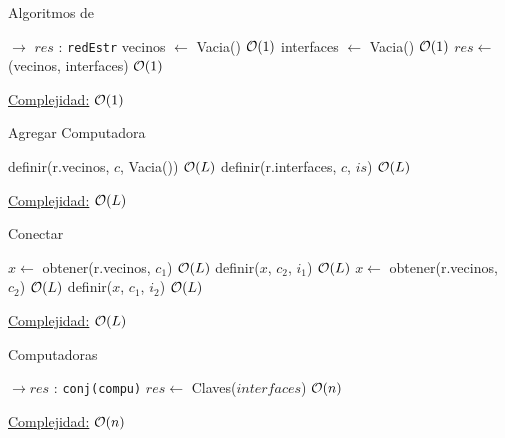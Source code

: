 \begin{Algoritmos}


\begin{algorithm}
  \caption{Algoritmos de }
\begin{algorithmic}[1]
   $\to$ $res$ : \texttt{redEstr}
  \State vecinos $\gets$ Vacia() \Comment $\mathcal{O}(1)$
  \State interfaces $\gets$ Vacia() \Comment $\mathcal{O}(1)$
  \State $res \gets$ (vecinos, interfaces) \Comment $\mathcal{O}(1)$
  \EndProcedure
\end{algorithmic}
  \underline{Complejidad:} $\mathcal{O}(1)$
\end{algorithm}


\begin{algorithm}
\caption{Agregar Computadora}
\begin{algorithmic}[1]
  \State definir(r.vecinos, $c$, Vacia()) \Comment $\mathcal{O}(L)$
  \State definir(r.interfaces, $c$, $is$) \Comment $\mathcal{O}(L)$
 \EndProcedure
\end{algorithmic}
	\underline{Complejidad:} $\mathcal{O}(L)$
\end{algorithm}


\begin{algorithm}
\caption{Conectar}
\begin{algorithmic}[1]
  \State $x \gets$ obtener(r.vecinos, $c_1$) \Comment $\mathcal{O}(L)$
  \State definir($x$, $c_2$, $i_1$) \Comment $\mathcal{O}(L)$
  \State $x \gets$ obtener(r.vecinos, $c_2$) \Comment $\mathcal{O}(L)$
  \State definir($x$, $c_1$, $i_2$) \Comment $\mathcal{O}(L)$
 \EndProcedure
\end{algorithmic}
 \underline{Complejidad:} $\mathcal{O}(L)$
\end{algorithm}



\begin{algorithm}
\caption{Computadoras}
\begin{algorithmic}[1]
   $\to res$ : \texttt{conj(compu)} 
  \State $res \gets$ Claves($interfaces$) \Comment $\mathcal{O}(n)$
 \EndProcedure
\end{algorithmic}
	\underline{Complejidad:} $\mathcal{O}(n)$
\end{algorithm}



\end{Algoritmos}
